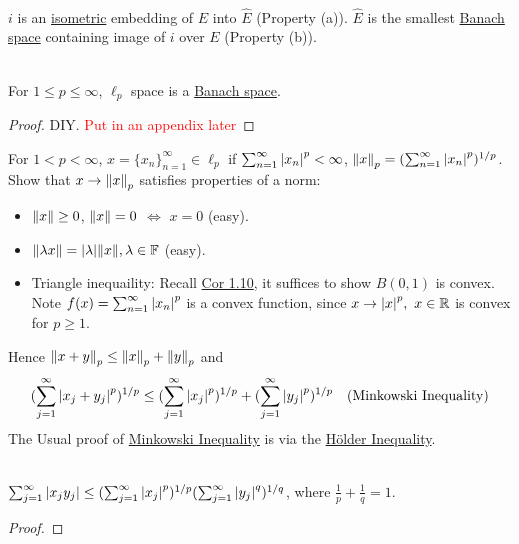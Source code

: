 \begin{remark}\ \\
    $i$ is an \underline{isometric} embedding of $E$ into $\hat{E}$ (Property (a)). $\hat{E}$ is the smallest \underline{Banach space} containing image of $i$ over $E$ (Property (b)). 
\end{remark}

\begin{theorem}\ \\
For $1 \leq p \leq \infty$, $\ell_p$ space is a \underline{Banach space}.
\end{theorem}
\begin{proof}
DIY. \textcolor{red}{Put in an appendix later}
\end{proof}
\begin{remark}
    For $1 < p < \infty$, $x = \{x_n\}_{n = 1}^\infty \in \ell_p$ if $\sum_{n=1}^\infty \abs{x_n}^p < \infty$, $\norm{x}_p = (\sum_{n=1}^\infty \abs{x_n}^p)^{1/p}$.\\
    Show that $x \to \norm{x}_p$ satisfies properties of a norm:
    \begin{itemize}
        \item $\norm{x} \geq 0$, $\norm{x} = 0$ $\Leftrightarrow$ $x = 0$ (easy).
        \item $\norm{\lambda x} = \abs{\lambda} \norm{x}, \lambda \in \mathbb{F}$ (easy).
        \item Triangle inequaility: Recall \hyperref[1.10]{Cor 1.10}, it suffices to show $B(0,1)$ is convex. Note $f(x) = \sum_{n=1}^\infty \abs{x_n}^p$ is a convex function, since $x \to \abs{x}^p,\ x \in \mathbb{R}$ is convex for $p \geq 1$.
    \end{itemize}
    Hence $\norm{x + y}_p \leq \norm{x}_p + \norm{y}_p$ and
        \begin{equation*}
            (\sum_{j=1}^\infty \abs{x_j + y_j}^p)^{1/p} \leq (\sum_{j=1}^\infty \abs{x_j}^p)^{1/p} + (\sum_{j=1}^\infty \abs{y_j}^p)^{1/p} \quad (\text{Minkowski Inequality})
        \end{equation*}
    The Usual proof of \underline{Minkowski Inequality} is via the \underline{H\"older Inequality}.
    \begin{lemma}\ \\
$\sum_{j = 1}^\infty \abs{x_j y_j} \leq (\sum_{j = 1}^\infty \abs{x_j}^p)^{1/p} (\sum_{j = 1}^\infty \abs{y_j}^q)^{1/q}$, where $\frac{1}{p} + \frac{1}{q} = 1.$
    \end{lemma}
\begin{proof}

\end{proof}
\end{remark}

